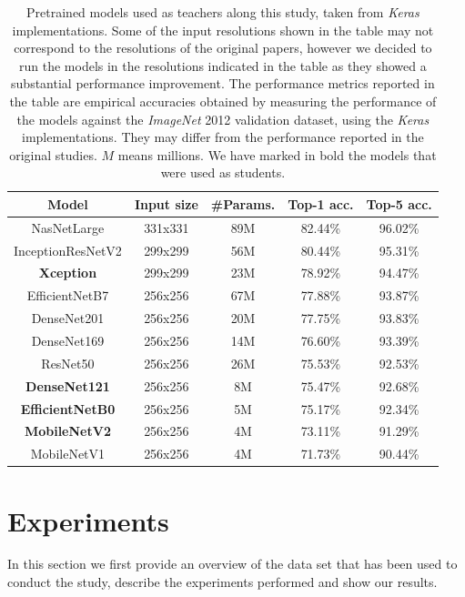 \begin{table}[h]
	\small
	\caption{Pretrained models used as teachers along this study, taken from \textit{Keras} implementations. Some of the input resolutions shown in the table may not correspond to the resolutions of the original papers, however we decided to run the models in the resolutions indicated in the table as they showed a substantial performance improvement. The performance metrics reported in the table are empirical accuracies obtained by measuring the performance of the models against the \textit{ImageNet} 2012 validation dataset, using the \textit{Keras} implementations. They may differ from the performance reported in the original studies. $M$ means millions. We have marked in bold the models that were used as students.}
	\centering
\begin{tabular}{c|cc|cc}
	\toprule
       Model          & Input size & \#Params. & Top-1 acc. & Top-5 acc. \\ \midrule
    NasNetLarge       &  331x331   &    89M    &  82.44\%   &  96.02\%   \\
 InceptionResNetV2    &  299x299   &    56M    &  80.44\%   &  95.31\%   \\
 \textbf{Xception}    &  299x299   &    23M    &  78.92\%   &  94.47\%   \\
  EfficientNetB7      &  256x256   &    67M    &  77.88\%   &  93.87\%   \\
    DenseNet201       &  256x256   &    20M    &  77.75\%   &  93.83\%   \\
    DenseNet169       &  256x256   &    14M    &  76.60\%   &  93.39\%   \\
     ResNet50         &  256x256   &    26M    &  75.53\%   &  92.53\%   \\
 \textbf{DenseNet121}   &  256x256   &    8M     &  75.47\%   &  92.68\%   \\
	\textbf{EfficientNetB0} &  256x256   &    5M     &  75.17\%   &  92.34\%   \\
 \textbf{MobileNetV2}   &  256x256   &    4M     &  73.11\%   &  91.29\%   \\
    MobileNetV1       &  256x256   &    4M     &  71.73\%   &  90.44\%   \\ \bottomrule
\end{tabular}
\label{table:models}
\end{table}

\section{Experiments} \label{sec:distillation_experiments}
In this section we first provide an overview of the data set that has been used to conduct the study, describe the experiments performed and show our results.

